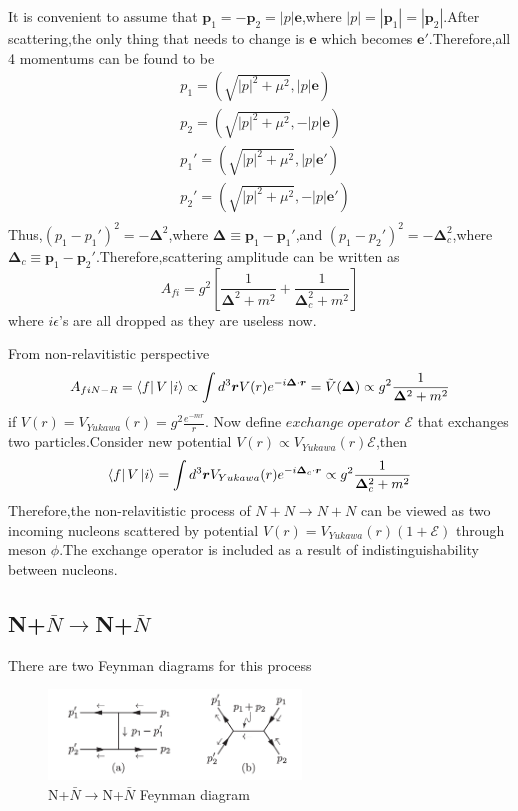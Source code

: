 \documentclass[a4paper]{article}
\begin{document}
It is convenient to assume that $\bm{p}_1=-\bm{p}_2=|p|\bm{e}$,where $|p|=|\bm{p}_1|=|\bm{p}_2|$.After scattering,the only thing that needs to change is $\bm{e}$ which becomes $\bm{e}'$.Therefore,all 4 momentums can be found to be
\begin{align*}
	&p_1=(\sqrt{|p|^2+\mu^2},|p|\bm{e})\\
	&p_2=(\sqrt{|p|^2+\mu^2},-|p|\bm{e})\\
	&p_1'=(\sqrt{|p|^2+\mu^2},|p|\bm{e}')\\
	&p_2'=(\sqrt{|p|^2+\mu^2},-|p|\bm{e}')\\
\end{align*}
Thus,$(p_1-p_1')^2=-\bm{\Delta}^2$,where $\bm{\Delta}\equiv\bm{p}_1-\bm{p}_1'$,and $(p_1-p_2')^2=-\bm{\Delta}_c^2$,where $\bm{\Delta}_c\equiv\bm{p}_1-\bm{p}_2'$.Therefore,scattering amplitude can be written as$$A_{fi}=g^2[\frac{1}{\bm{\Delta}^2+m^2}+\frac{1}{\bm{\Delta}_c^2+m^2}]$$where $i\epsilon$'s are all dropped as they are useless now.
\par From non-relavitistic perspective$$A_{fiN-R}=\bra{f}V\ket{i}\propto\int d^3\bm{r}V(r)e^{-i\bm{\Delta}\cdot\bm{r}}=\tilde{V}(\bm{\Delta})\propto g^2\frac{1}{\bm{\Delta}^2+m^2}$$if $V(r)=V_{Yukawa}(r)=g^2\frac{e^{-mr}}{r}$.
Now define $exchange\;operator$ $\mathscr{E}$ that exchanges two particles.Consider new potential $V(r)\propto V_{Yukawa}(r)\mathscr{E}$,then$$\bra{f}V\ket{i}=\int d^3\bm{r}V_{Yukawa}(r)e^{-i\bm{\Delta}_c\cdot\bm{r}}\propto g^2\frac{1}{\bm{\Delta}^2_c+m^2}$$
Therefore,the non-relavitistic process of $N+N\rightarrow N+N$ can be viewed as two incoming nucleons scattered by potential $V(r)=V_{Yukawa}(r)(1+\mathscr{E})$ through meson $\phi$.The exchange operator is included as a result of indistinguishability between nucleons.
\subsection{N+$\bar{N}\rightarrow$N+$\bar{N}$}
There are two Feynman diagrams for this process
\begin{figure}[htbp]
	\centering
	\includegraphics[width=0.6\textwidth]{9.png}
	\caption{N+$\bar{N}\rightarrow$N+$\bar{N}$ Feynman diagram}
\end{figure}
\end{document}
